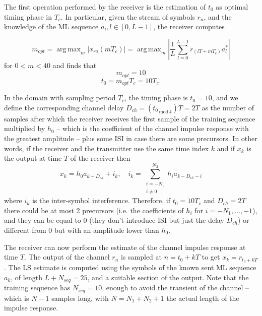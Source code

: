 \documentclass[10pt]{article}
\DeclareMathOperator*{\argmax}{arg\,max}
\newcommand{\lmod}[1] {_{\,\mathrm{mod}\,#1}}
\begin{document}
The first operation performed by the receiver is the estimation of $t_0$ as optimal timing phase in $T_c$. In particular, given the stream of symbols $r_n$, and the knowledge of the ML sequence $a_l, l\in [0, L-1]$, the receiver computes

\begin{equation}
	m_{opt} = \argmax_{m} | x_{ra}(mT_c) | = \argmax_{m} \left| \frac{1}{L} \sum_{l = 0}^{L - 1} r_{(lT + mT_c)}a^*_l \right|
\end{equation}
for $ 0 < m < 40$ and finds that
\begin{equation}
	m_{opt} = 10
\end{equation}
\begin{equation}
	t_{0} = m_{opt}T_c = 10 T_c.
\end{equation}

In the domain with sampling period $T_c$, the timing phase is $t_0 = 10$, and we define the corresponding channel delay $D_{ch} = ({t_0}\lmod{4})T = 2T$ as the number of samples after which the receiver receives the first sample of the training sequence multiplied by $h_0$ -- which is the coefficient of the channel impulse response with the greatest amplitude -- plus some ISI in case there are some precursors. In other words, if the receiver and the transmitter use the same time index $k$ and if $x_k$ is the output at time $T$ of the receiver then
\begin{equation}
x_{k} = h_0a_{k-D_{ch}} + i_k, \quad i_k = \sum_{\substack{i = -N_1 \\ i \neq 0}}^{N_2} h_i a_{k-D_{ch}-i}
\end{equation}
where $i_k$ is the inter-symbol interference. Therefore, if $t_0 = 10T_c$ and $D_{ch} = 2T$ there could be at most 2 precursors (i.e. the coefficients of $h_i$ for $i = -N_1, \dots, -1$), and they can be equal to 0 (they don't introduce ISI but just the delay $D_{ch}$) or different from 0 but with an amplitude lower than $h_0$. 

The receiver can now perform the estimate of the channel impulse response at time $T$. The output of the channel $r_n$ is sampled at $n = t_0 + kT$ to get $x_k = r_{t_0 + kT}$. The LS estimate is computed using the symbols of the known sent ML sequence $a_k$, of length $L + N_{seq} = 25$, and a suitable section of the output. Note that the training sequence has $N_{seq} = 10$, enough to avoid the transient of the channel -- which is $N - 1$ samples long, with $N = N_1 + N_2 + 1$ the actual length of the impulse response.
\end{document}
